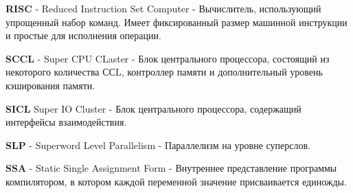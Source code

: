 \textbf{RISC} - Reduced Instruction Set Computer -  Вычислитель, использующий упрощенный набор команд. Имеет фиксированный размер машинной инструкции и простые для исполнения операции. 

\textbf{SCCL} - Super CPU CLaster - Блок центрального процессора, состоящий из некоторого количества ССL, контроллер памяти и  дополнительный уровень кэширования памяти.

\textbf{SICL} Super IO Cluster - Блок центрального процессора, содержащий интерфейсы взаимодействия.

\textbf{SLP} - Superword Level Parallelism - Параллелизм на уровне суперслов.

\textbf{SSA} - Static Single Assignment Form - Внутреннее представление программы компилятором, в котором каждой переменной значение присваивается единожды.



